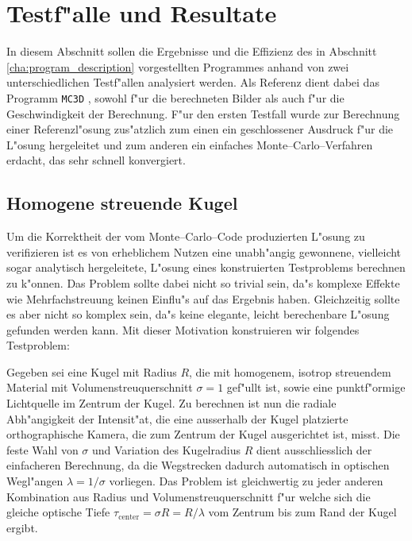 	\chapter{Testf"alle und Resultate}
	In diesem Abschnitt sollen die Ergebnisse und die Effizienz des in Abschnitt \ref{cha:program_description} vorgestellten Programmes anhand von zwei unterschiedlichen Testf"allen analysiert werden. Als Referenz dient dabei das Programm \texttt{MC3D} \citep{Wolf:2003p12974}, sowohl f"ur die berechneten Bilder als auch f"ur die Geschwindigkeit der Berechnung. F"ur den ersten Testfall wurde zur Berechnung einer Referenzl"osung zus"atzlich zum einen ein geschlossener Ausdruck f"ur die L"osung hergeleitet und zum anderen ein einfaches Monte--Carlo--Verfahren erdacht, das sehr schnell konvergiert.
	
	\section{Homogene streuende Kugel}
	Um die Korrektheit der vom Monte--Carlo--Code produzierten L"osung zu verifizieren ist es von erheblichem Nutzen eine unabh"angig gewonnene, vielleicht sogar analytisch hergeleitete, L"osung eines konstruierten Testproblems berechnen zu k"onnen. Das Problem sollte dabei nicht so trivial sein, da"s komplexe Effekte wie Mehrfachstreuung keinen Einflu"s auf das Ergebnis haben. Gleichzeitig sollte es aber nicht so komplex sein, da"s keine elegante, leicht berechenbare L"osung gefunden werden kann.
	Mit dieser Motivation konstruieren wir folgendes Testproblem:
		
	Gegeben sei eine Kugel mit Radius $R$, die mit homogenem, isotrop streuendem Material mit Volumenstreuquerschnitt $\sigma=1$ gef"ullt ist, sowie eine punktf"ormige Lichtquelle im Zentrum der Kugel. Zu berechnen ist nun die radiale Abh"angigkeit der Intensit"at, die eine ausserhalb der Kugel platzierte orthographische Kamera, die zum Zentrum der Kugel ausgerichtet ist, misst. Die feste Wahl von $\sigma$ und Variation des Kugelradius $R$ dient ausschliesslich der einfacheren Berechnung, da die Wegstrecken dadurch automatisch in optischen Wegl"angen $\lambda=1/\sigma$ vorliegen. Das Problem ist gleichwertig zu jeder anderen Kombination aus Radius und Volumenstreuquerschnitt f"ur welche sich die gleiche optische Tiefe $\tau_\text{center}=\sigma R=R/\lambda$ vom Zentrum bis zum Rand der Kugel ergibt.
	
